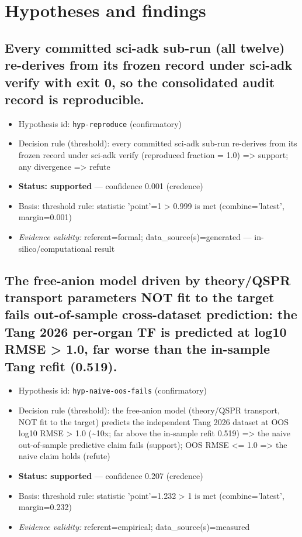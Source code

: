 \documentclass{article}
\begin{document}
\section{Hypotheses and findings}

\subsection{Every committed sci-adk sub-run (all twelve) re-derives from its frozen record under sci-adk verify with exit 0, so the consolidated audit record is reproducible.}
\begin{itemize}
  \item Hypothesis id: \texttt{hyp-reproduce} (confirmatory)
  \item Decision rule (threshold): every committed sci-adk sub-run re-derives from its frozen record under sci-adk verify (reproduced fraction = 1.0) => support; any divergence => refute
  \item \textbf{Status: supported} --- confidence 0.001 (credence)
  \item Basis: threshold rule: statistic 'point'=1 > 0.999 is met (combine='latest', margin=0.001)
  \item \textit{Evidence validity:} referent=formal; data\_source(s)=generated --- in-silico/computational result
\end{itemize}

\subsection{The free-anion model driven by theory/QSPR transport parameters NOT fit to the target fails out-of-sample cross-dataset prediction: the Tang 2026 per-organ TF is predicted at log10 RMSE > 1.0, far worse than the in-sample Tang refit (0.519).}
\begin{itemize}
  \item Hypothesis id: \texttt{hyp-naive-oos-fails} (confirmatory)
  \item Decision rule (threshold): the free-anion model (theory/QSPR transport, NOT fit to the target) predicts the independent Tang 2026 dataset at OOS log10 RMSE > 1.0 (\textasciitilde{}10x; far above the in-sample refit 0.519) => the naive out-of-sample predictive claim fails (support); OOS RMSE <= 1.0 => the naive claim holds (refute)
  \item \textbf{Status: supported} --- confidence 0.207 (credence)
  \item Basis: threshold rule: statistic 'point'=1.232 > 1 is met (combine='latest', margin=0.232)
  \item \textit{Evidence validity:} referent=empirical; data\_source(s)=measured
\end{itemize}
\end{document}

